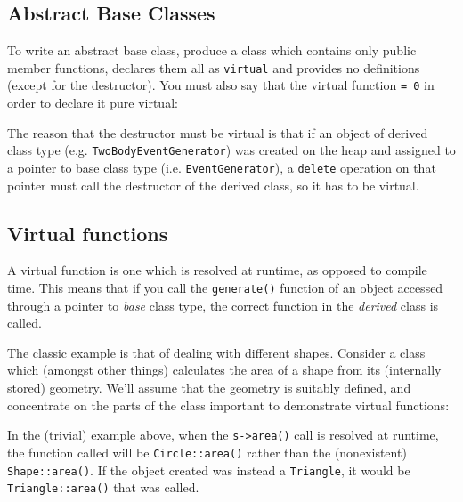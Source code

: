 \documentclass[a4paper]{scrartcl}
\begin{document}
\subsection{Abstract Base Classes}
To write an abstract base class, produce a class which contains only public member functions, declares them all as \verb|virtual| and provides no definitions (except for the destructor). You must also say that the virtual function \verb|= 0| in order to declare it pure virtual:



The reason that the destructor must be virtual is that if an object of derived class type (e.g. \verb|TwoBodyEventGenerator|) was created on the heap and assigned to a pointer to base class type (i.e. \verb|EventGenerator|), a \verb|delete| operation on that pointer must call the destructor of the derived class, so it has to be virtual.

\subsection{Virtual functions}
A virtual function is one which is resolved at runtime, as opposed to compile time. This means that if you call the \verb|generate()| function of an object accessed through a pointer to \emph{base} class type, the correct function in the \emph{derived} class is called.

The classic example is that of dealing with different shapes. Consider a class which (amongst other things) calculates the area of a shape from its (internally stored) geometry. We'll assume that the geometry is suitably defined, and concentrate on the parts of the class important to demonstrate virtual functions:



In the (trivial) example above, when the \verb|s->area()| call is resolved at runtime, the function called will be \verb|Circle::area()| rather than the (nonexistent) \verb|Shape::area()|. If the object created was instead a \verb|Triangle|, it would be \verb|Triangle::area()| that was called.
\end{document}
